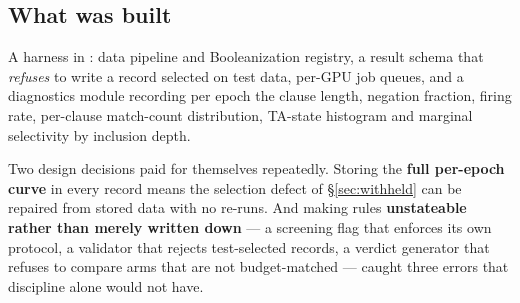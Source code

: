 \subsection{What was built}
A harness in : data pipeline and Booleanization registry, a result
schema that \emph{refuses} to write a record selected on test data, per-GPU job queues, and a
diagnostics module recording per epoch the clause length, negation fraction, firing rate, per-clause
match-count distribution, TA-state histogram and marginal selectivity by inclusion depth.

Two design decisions paid for themselves repeatedly. Storing the \textbf{full per-epoch curve} in
every record means the selection defect of \S\ref{sec:withheld} can be repaired from stored data with
no re-runs. And making rules \textbf{unstateable rather than merely written down} --- a screening flag
that enforces its own protocol, a validator that rejects test-selected records, a verdict generator
that refuses to compare arms that are not budget-matched --- caught three errors that discipline
alone would not have.
